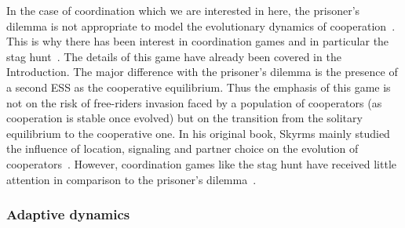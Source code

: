             In the case of coordination which we are interested in here, the prisoner's dilemma is not appropriate to model the evolutionary dynamics of cooperation~\parencite{Alvard2002, Skyrms2004}. This is why there has been interest in coordination games and in particular the stag hunt~\parencite{Skyrms2004, Requejo2013a}. The details of this game have already been covered in the Introduction. The major difference with the prisoner's dilemma is the presence of a second ESS as the cooperative equilibrium. Thus the emphasis of this game is not on the risk of free-riders invasion faced by a population of cooperators (as cooperation is stable once evolved) but on the transition from the solitary equilibrium to the cooperative one. In his original book, Skyrms mainly studied the influence of location, signaling and partner choice on the evolution of cooperators~\parencite{Skyrms2004}. However, coordination games like the stag hunt have received little attention in comparison to the prisoner's dilemma~\parencite{Iyer2016}.



        \subsubsection{Adaptive dynamics}

